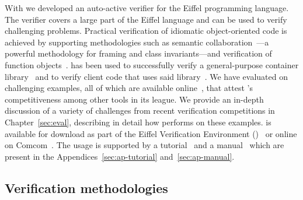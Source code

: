 With \AutoProof we developed an auto-active verifier for the Eiffel programming language. The verifier covers a large part of the Eiffel language and can be used to verify challenging problems. Practical verification of idiomatic object-oriented code is achieved by supporting methodologies such as semantic collaboration~\cite{POLIKARPOVA14}---a powerful methodology for framing and class invariants---and verification of function objects~\cite{NORDIO10}.
\AutoProof has been used to successfully verify a general-purpose container library~\cite{POLIKARPOVA15} and to verify client code that uses said library~\cite{FURIA15}.
We have evaluated \AutoProof on challenging examples, all of which are available online~\cite{APREPO}, that attest \AutoProof's competitiveness among other tools in its league.
We provide an in-depth discussion of a variety of challenges from recent verification competitions in Chapter~\ref{sec:eval}, describing in detail how \AutoProof performs on these examples.
\AutoProof is available for download as part of the Eiffel Verification Environment (\EVE)~\cite{EVE} or online on Comcom~\cite{APCOMCOM}. The usage is supported by a tutorial~\cite{APTUTORIAL} and a manual~\cite{APMANUAL} which are present in the Appendices~\ref{sec:ap-tutorial} and~\ref{sec:ap-manual}.




\subsection{Verification methodologies}


